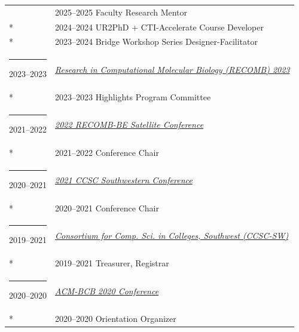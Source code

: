 \documentclass[margin,line]{res}
\begin{document}
\begin{resume}
\begin{longtable}{@{}p{0.7in}p{4in}}
\hspace*{-4mm} & \hspace{4mm} 2025--2025 Faculty Research Mentor\\*
\hspace*{-4mm} & \hspace{4mm} 2024--2024 UR2PhD + CTI-Accelerate Course Developer\\*
\hspace*{-4mm} & \hspace{4mm} 2023--2024 Bridge Workshop Series Designer-Facilitator\\
\hspace*{-4mm} \rule{-1mm}{5mm} 2023--2023 & \href{http://recomb2023.bilkent.edu.tr/}{\textit{Research in Computational Molecular Biology (RECOMB) 2023}}\\*
\hspace*{-4mm} & \hspace{4mm} 2023--2023 Highlights Program Committee\\
\hspace*{-4mm} \rule{-1mm}{5mm} 2021--2022 & \href{https://sites.google.com/eng.ucsd.edu/recomb-be-2022}{\textit{2022 RECOMB-BE Satellite Conference}}\\*
\hspace*{-4mm} & \hspace{4mm} 2021--2022 Conference Chair\\
\hspace*{-4mm} \rule{-1mm}{5mm} 2020--2021 & \href{http://www.ccsc.org/southwestern/index.php}{\textit{2021 CCSC Southwestern Conference}}\\*
\hspace*{-4mm} & \hspace{4mm} 2020--2021 Conference Chair\\
\hspace*{-4mm} \rule{-1mm}{5mm} 2019--2021 & \href{http://www.ccsc.org/southwestern/index.php}{\textit{Consortium for Comp. Sci. in Colleges, Southwest (CCSC-SW)}}\\*
\hspace*{-4mm} & \hspace{4mm} 2019--2021 Treasurer, Registrar\\
\hspace*{-4mm} \rule{-1mm}{5mm} 2020--2020 & \href{https://acm-bcb.org/2020}{\textit{ACM-BCB 2020 Conference}}\\*
\hspace*{-4mm} & \hspace{4mm} 2020--2020 Orientation Organizer\\

\end{longtable}
\end{resume}
\end{document}
